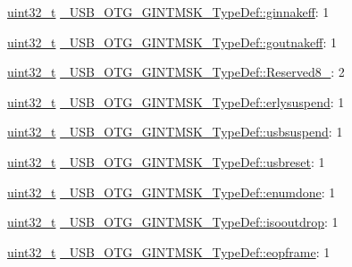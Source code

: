\begin{DoxyCompactItemize}
\item 
\hyperlink{stdint_8h_a435d1572bf3f880d55459d9805097f62}{uint32\-\_\-t} \hyperlink{group___u_s_b___o_t_g___d_r_i_v_e_r_ga0b8ad750aae7a0c2e0a3027dbe3a8e59}{\-\_\-\-U\-S\-B\-\_\-\-O\-T\-G\-\_\-\-G\-I\-N\-T\-M\-S\-K\-\_\-\-Type\-Def\-::ginnakeff}\-: 1
\item 
\hyperlink{stdint_8h_a435d1572bf3f880d55459d9805097f62}{uint32\-\_\-t} \hyperlink{group___u_s_b___o_t_g___d_r_i_v_e_r_gac1246a6e7449fa058ef2be6ef623d06b}{\-\_\-\-U\-S\-B\-\_\-\-O\-T\-G\-\_\-\-G\-I\-N\-T\-M\-S\-K\-\_\-\-Type\-Def\-::goutnakeff}\-: 1
\item 
\hyperlink{stdint_8h_a435d1572bf3f880d55459d9805097f62}{uint32\-\_\-t} \hyperlink{group___u_s_b___o_t_g___d_r_i_v_e_r_gaabc7a277eeafc9497a745a5ca980f27e}{\-\_\-\-U\-S\-B\-\_\-\-O\-T\-G\-\_\-\-G\-I\-N\-T\-M\-S\-K\-\_\-\-Type\-Def\-::\-Reserved8\-\_}\-: 2
\item 
\hyperlink{stdint_8h_a435d1572bf3f880d55459d9805097f62}{uint32\-\_\-t} \hyperlink{group___u_s_b___o_t_g___d_r_i_v_e_r_ga3ff2cc12f2439bd3361c5edb414c07b1}{\-\_\-\-U\-S\-B\-\_\-\-O\-T\-G\-\_\-\-G\-I\-N\-T\-M\-S\-K\-\_\-\-Type\-Def\-::erlysuspend}\-: 1
\item 
\hyperlink{stdint_8h_a435d1572bf3f880d55459d9805097f62}{uint32\-\_\-t} \hyperlink{group___u_s_b___o_t_g___d_r_i_v_e_r_ga661a2da9b63b983f395dce07f25c72bd}{\-\_\-\-U\-S\-B\-\_\-\-O\-T\-G\-\_\-\-G\-I\-N\-T\-M\-S\-K\-\_\-\-Type\-Def\-::usbsuspend}\-: 1
\item 
\hyperlink{stdint_8h_a435d1572bf3f880d55459d9805097f62}{uint32\-\_\-t} \hyperlink{group___u_s_b___o_t_g___d_r_i_v_e_r_ga4ca380dede566ab5effaceb4ff0ef506}{\-\_\-\-U\-S\-B\-\_\-\-O\-T\-G\-\_\-\-G\-I\-N\-T\-M\-S\-K\-\_\-\-Type\-Def\-::usbreset}\-: 1
\item 
\hyperlink{stdint_8h_a435d1572bf3f880d55459d9805097f62}{uint32\-\_\-t} \hyperlink{group___u_s_b___o_t_g___d_r_i_v_e_r_ga975455f064183c733669c1d1d8135226}{\-\_\-\-U\-S\-B\-\_\-\-O\-T\-G\-\_\-\-G\-I\-N\-T\-M\-S\-K\-\_\-\-Type\-Def\-::enumdone}\-: 1
\item 
\hyperlink{stdint_8h_a435d1572bf3f880d55459d9805097f62}{uint32\-\_\-t} \hyperlink{group___u_s_b___o_t_g___d_r_i_v_e_r_gadcb6c03184ea4654f1333089771c13e9}{\-\_\-\-U\-S\-B\-\_\-\-O\-T\-G\-\_\-\-G\-I\-N\-T\-M\-S\-K\-\_\-\-Type\-Def\-::isooutdrop}\-: 1
\item 
\hyperlink{stdint_8h_a435d1572bf3f880d55459d9805097f62}{uint32\-\_\-t} \hyperlink{group___u_s_b___o_t_g___d_r_i_v_e_r_gaa41af202a77badbee7d1e29d3b3f95e9}{\-\_\-\-U\-S\-B\-\_\-\-O\-T\-G\-\_\-\-G\-I\-N\-T\-M\-S\-K\-\_\-\-Type\-Def\-::eopframe}\-: 1

\end{DoxyCompactItemize}
